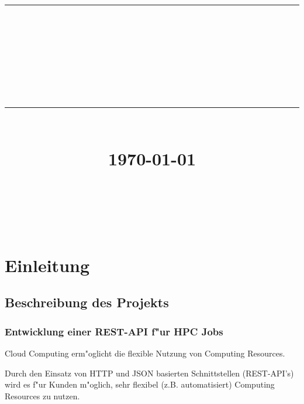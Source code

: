 \documentclass[12pt]{article}
\newcommand{\HRule}[1]{\rule{\linewidth}{#1}}
\begin{document}
\title{ \normalsize
		\HRule{0.5pt} \\
		\LARGE \textbf{\uppercase{\newCommandDiscipline}} \\
		\smallbreak
		\small\textbf{{\newCommandTerm}}\\
		\HRule{2pt} \\ [0.5cm]
		\normalsize \today \vspace*{10\baselineskip}}

\date{}

\author{
		\newCommandName \\
		\newCommandMatriculationNumber \\
		\newCommandUniversity \\
		\newCommandFaculty
}


\maketitle

\thispagestyle{empty}
\newpage
\tableofcontents
\setcounter{page}{1}

\newpage

\sectionfont{\scshape}


\section{Einleitung}
\subsection{Beschreibung des Projekts}

\subsubsection{Entwicklung einer REST-API f"ur HPC Jobs}
Cloud Computing erm"oglicht die flexible Nutzung von Computing Resources.

Durch den Einsatz von HTTP und JSON basierten Schnittstellen (REST-API's) wird es f"ur Kunden m"oglich, sehr flexibel (z.B. automatisiert) Computing Resources zu nutzen.
\end{document}
